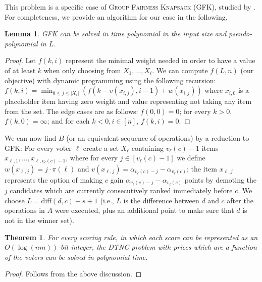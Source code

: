 \documentclass[letterpaper]{article} %
\newtheorem{theorem}{Theorem}
\newtheorem{lemma}{Lemma}
\newcommand{\DTNC}{\textsc{DTNC}}
\newcommand{\CIK}{\textsc{GFK}}
\newcommand{\abs}[1]{\lvert{#1}\rvert}
\newcommand{\diff}{\mathrm{diff}}
\begin{document}
This problem is a specific case of \textsc{Group Fairness Knapsack} (\CIK{}), studied by \citet{DBLP:journals/corr/abs-2006-07832}. For completeness, we provide an algorithm for our case in the following.
\begin{lemma}
\CIK{} can be solved in time polynomial in the input size and  pseudo-polynomial in $L$.
\end{lemma}
\begin{proof}
Let $f(k, i)$ represent the minimal weight needed in order to have a value of at least $k$ when only choosing from $X_1,\ldots,X_i$.
We can compute $f(L, n)$ (our objective) with dynamic programming using the following recursion:
$f(k, i) = \min_{0 \leq j \leq \abs{X_i}}(f(k - v(x_{i, j}), i - 1) + w(x_{i, j}))$ where $x_{i, 0}$ is a placeholder item  having zero weight and value representing not taking any item from the set. The edge cases are as follows:
$f(0, 0) = 0$; for every $k > 0 $,  $f(k, 0) = \infty$; and for each $k < 0, i \in [n]$, $ f(k, i) = 0$.
\end{proof}
We can now find $B$ (or an equivalent sequence of operations) by a reduction to \CIK{}:
For every voter $\ell$ create a set $X_\ell$ containing $v_\ell(c)-1$ items $x_{\ell,1},\ldots,x_{\ell,v_\ell(c) - 1}$, where for every $j \in [v_\ell(c) - 1]$ we define $w(x_{\ell, j}) = j \cdot \pi(\ell)$ and $v(x_{\ell, j}) = \alpha_{v_\ell(c) - j} - \alpha_{v_\ell(c)}$; the item $x_{\ell, j}$ represents the option of making $c$ gain $\alpha_{v_\ell(c) - j} - \alpha_{v_\ell(c)}$ points by demoting the $j$ candidates which are currently consecutively ranked immediately before $c$. We choose $L = \diff(d, c) - s + 1$ (i.e., $L$ is the difference between $d$ and $c$ after  the operations in $A$ were executed, plus an additional point to make sure that $d$ is not in the winner set).
\begin{theorem}
For every scoring rule, in which each score can be represented as an $O(\log{(nm)})$-bit integer, the \DTNC{} problem with prices which are a function of the voters can be solved in polynomial time.
\end{theorem}
\begin{proof}
Follows from the above discussion.
\end{proof}
\end{document}
